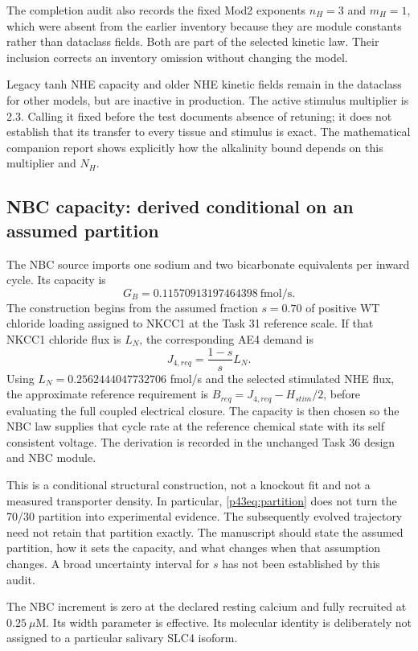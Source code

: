 The completion audit also records the fixed Mod2 exponents $n_H=3$ and $m_H=1$, which were absent from the earlier inventory because they are module constants rather than dataclass fields. Both are part of the selected kinetic law. Their inclusion corrects an inventory omission without changing the model.

Legacy tanh NHE capacity and older NHE kinetic fields remain in the dataclass for other models, but are inactive in production. The active stimulus multiplier is 2.3. Calling it fixed before the test documents absence of retuning; it does not establish that its transfer to every tissue and stimulus is exact. The mathematical companion report shows explicitly how the alkalinity bound depends on this multiplier and $N_H$.

\subsection{NBC capacity: derived conditional on an assumed partition}
The NBC source imports one sodium and two bicarbonate equivalents per inward cycle. Its capacity is
\[
 G_B=0.11570913197464398\ \mathrm{fmol/s}.
\]
The construction begins from the assumed fraction $s=0.70$ of positive WT chloride loading assigned to NKCC1 at the Task 31 reference scale. If that NKCC1 chloride flux is $L_N$, the corresponding AE4 demand is
\begin{equation}
 J_{4,req}=\frac{1-s}{s}L_N.
 \label{p43eq:partition}
\end{equation}
Using $L_N=0.2562444047732706$ fmol/s and the selected stimulated NHE flux, the approximate reference requirement is $B_{req}=J_{4,req}-H_{stim}/2$, before evaluating the full coupled electrical closure. The capacity is then chosen so the NBC law supplies that cycle rate at the reference chemical state with its self consistent voltage. The derivation is recorded in the unchanged Task 36 design and NBC module.

This is a conditional structural construction, not a knockout fit and not a measured transporter density. In particular, \cref{p43eq:partition} does not turn the 70/30 partition into experimental evidence. The subsequently evolved trajectory need not retain that partition exactly. The manuscript should state the assumed partition, how it sets the capacity, and what changes when that assumption changes. A broad uncertainty interval for $s$ has not been established by this audit.

The NBC increment is zero at the declared resting calcium and fully recruited at $0.25\ \mu$M. Its width parameter is effective. Its molecular identity is deliberately not assigned to a particular salivary SLC4 isoform.


